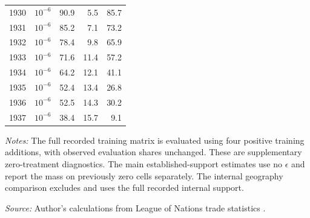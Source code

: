 \begin{table}[!htbp]
\begin{threeparttable}
\begin{tabular}{@{}llrrr@{}}
1930 & $10^{-6}$ & 90.9 & 5.5 & 85.7 \\
1931 & $10^{-6}$ & 85.2 & 7.1 & 73.2 \\
1932 & $10^{-6}$ & 78.4 & 9.8 & 65.9 \\
1933 & $10^{-6}$ & 71.6 & 11.4 & 57.2 \\
1934 & $10^{-6}$ & 64.2 & 12.1 & 41.1 \\
1935 & $10^{-6}$ & 52.4 & 13.4 & 26.8 \\
1936 & $10^{-6}$ & 52.5 & 14.3 & 30.2 \\
1937 & $10^{-6}$ & 38.4 & 15.7 & 9.1 \\
\bottomrule
\end{tabular}
\begin{tablenotes}[flushleft]\footnotesize\item \textit{Notes:} The full recorded training matrix is evaluated using four positive training additions, with observed evaluation shares unchanged. These are supplementary zero-treatment diagnostics. The main established-support estimates use no $\epsilon$ and report the mass on previously zero cells separately. The internal geography comparison excludes \External{} and uses the full recorded internal support.
\item \textit{Source:} Author's calculations from League of Nations trade statistics \parencite{league1930,league1936,league1938}.
\end{tablenotes}\end{threeparttable}\end{table}

